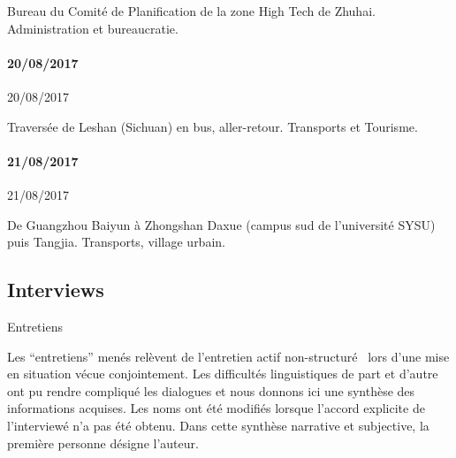 Bureau du Comité de Planification de la zone High Tech de Zhuhai. Administration et bureaucratie.



\paragraph{20/08/2017}{20/08/2017}

Traversée de Leshan (Sichuan) en bus, aller-retour. Transports et Tourisme.



\paragraph{21/08/2017}{21/08/2017}

De Guangzhou Baiyun à Zhongshan Daxue (campus sud de l'université SYSU) puis Tangjia. Transports, village urbain.














\subsection{Interviews}{Entretiens}


Les ``entretiens'' menés relèvent de l'entretien actif non-structuré~\cite{holstein2004active} lors d'une mise en situation vécue conjointement. Les difficultés linguistiques de part et d'autre ont pu rendre compliqué les dialogues et nous donnons ici une synthèse des informations acquises. Les noms ont été modifiés lorsque l'accord explicite de l'interviewé n'a pas été obtenu. Dans cette synthèse narrative et subjective, la première personne désigne l'auteur.





